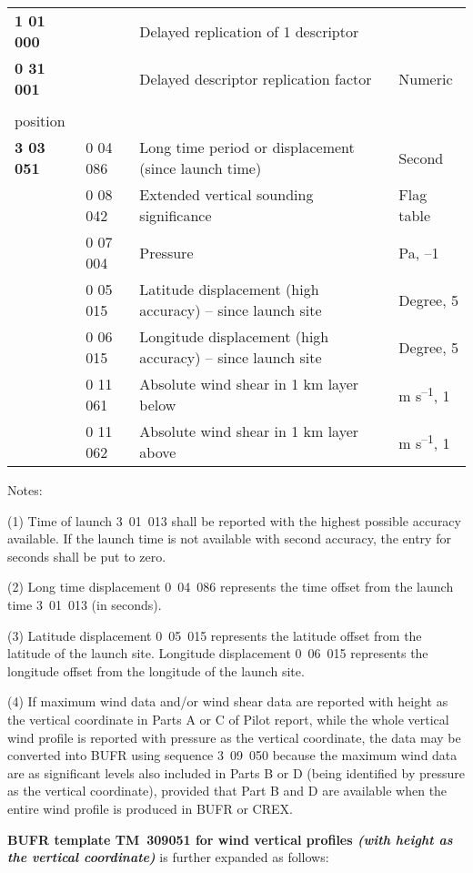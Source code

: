 \begin{longtable}[]{@{}llll@{}}
\textbf{1 01 000} & & Delayed replication of 1 descriptor &\tabularnewline
\textbf{0 31 001} & & Delayed descriptor replication factor & Numeric\tabularnewline
& & \emph{Wind shear data at a pressure level with radiosonde\\
position} &\tabularnewline
\textbf{3 03 051} & 0 04 086 & Long time period or displacement (since launch time) & Second\tabularnewline
& 0 08 042 & Extended vertical sounding significance & Flag table\tabularnewline
& 0 07 004 & Pressure & Pa, --1\tabularnewline
& 0 05 015 & Latitude displacement (high accuracy) -- since launch site & Degree, 5\tabularnewline
& 0 06 015 & Longitude displacement (high accuracy) -- since launch site & Degree, 5\tabularnewline
& 0 11 061 & Absolute wind shear in 1 km layer below & m s\textsuperscript{--1}, 1\tabularnewline
& 0 11 062 & Absolute wind shear in 1 km layer above & m s\textsuperscript{--1}, 1\tabularnewline
\bottomrule
\end{longtable}

Notes:

(1) Time of launch 3~01~013 shall be reported with the highest possible accuracy available. If the launch time is not available with second accuracy, the entry for seconds shall be put to zero.

(2) Long time displacement 0~04~086 represents the time offset from the launch time 3~01~013 (in seconds).

(3) Latitude displacement 0~05~015 represents the latitude offset from the latitude of the launch site. Longitude displacement 0~06~015 represents the longitude offset from the longitude of the launch site.

(4) If maximum wind data and/or wind shear data are reported with height as the vertical coordinate in Parts A or C of Pilot report, while the whole vertical wind profile is reported with pressure as the vertical coordinate, the data may be converted into BUFR using sequence 3~09~050 because the maximum wind data are as significant levels also included in Parts B or D (being identified by pressure as the vertical coordinate), provided that Part B and D are available when the entire wind profile is produced in BUFR or CREX.

\textbf{BUFR template TM~309051 for wind vertical profiles \emph{(with height as the vertical coordinate)}} is further expanded as follows:

